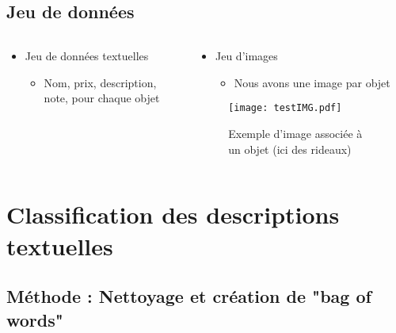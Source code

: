 \documentclass[8pt,aspectratio=169,hyperref={unicode=true}]{beamer}
\begin{document}
\subsection{Jeu de données}
\begin{frame}{\insertsubsection}
    \begin{columns}
        \begin{column}{.5\textwidth}
            \begin{itemize}
                \item Jeu de données textuelles
                      \begin{itemize}
                          \item Nom, prix, description, note, pour chaque objet
                      \end{itemize}
            \end{itemize}
            \begin{table}
                
            \end{table}
        \end{column}
        \begin{column}{.5\textwidth}
            \begin{itemize}
                \item Jeu d'images
                      \begin{itemize}
                          \item Nous avons une image par objet
                      \end{itemize}
            \end{itemize}
            \begin{figure}
                \texttt{[image: testIMG.pdf]}
                \caption{Exemple d'image associée à un objet (ici des rideaux)}
            \end{figure}
        \end{column}
    \end{columns}
\end{frame}

\section{Classification des descriptions textuelles}
\subsection{Méthode : Nettoyage et création de "bag of words"}
\end{document}
